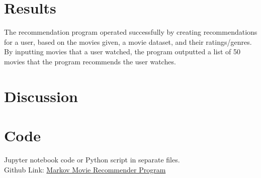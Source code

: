 \documentclass{article}
\begin{document}
\section{Results}

The recommendation program operated successfully by creating recommendations for a user, based on the movies 
given, a movie dataset, and their ratings/genres. By inputting movies that a user watched, the program outputted
a list of 50 movies that the program recommends the user watches. 

\section{Discussion}

\section{Code}

Jupyter notebook code or Python script in separate files.\\
Github Link: \href{https://github.com/ishaansathaye/LinAlg-MultivarCalc/blob/main/MarkovProject/MarkovRecommendation/MovieRecommender.ipynb}{Markov Movie Recommender Program}
\end{document}
